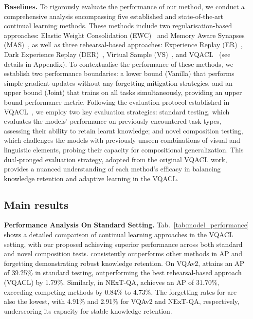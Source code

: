 \noindent\textbf{Baselines. }To rigorously evaluate the performance of our method, we conduct a comprehensive analysis encompassing five established and state-of-the-art continual learning methods. These methods include two regularisation-based approaches: Elastic Weight Consolidation (EWC)~\citep{kirkpatrick2017overcoming} and Memory Aware Synapses (MAS)~\citep{mas2018}, as well as three rehearsal-based approaches: Experience Replay (ER)~\citep{chaudhry2019tinyepisodicmemoriescontinual}, Dark Experience Replay (DER)~\citep{Chaudhry2019er}, Virtual Sample (VS)~\citep{Wan_2022_CVPR}, and VQACL~\citep{zhang2023vqacl} (see details in Appendix). To contextualise the performance of these methods, we establish two performance boundaries: a lower bound (Vanilla) that performs simple gradient updates without any forgetting mitigation strategies, and an upper bound (Joint) that trains on all tasks simultaneously, providing an upper bound performance metric. Following the evaluation protocol established in VQACL~\citep{zhang2023vqacl}, we employ two key evaluation strategies: standard testing, which evaluates the models' performance on previously encountered task types, assessing their ability to retain learnt knowledge; and novel composition testing, which challenges the models with previously unseen combinations of visual and linguistic elements, probing their capacity for compositional  generalization. This dual-pronged evaluation strategy, adopted from the original VQACL work, provides a nuanced understanding of each method's efficacy in balancing knowledge retention and adaptive learning in the VQACL.



\subsection{Main results}
\label{sec:mainresults}
\noindent\textbf{Performance Analysis On Standard Setting. }Tab.~\ref{tab:model_performance} shows a detailed comparison of continual learning approaches in the VQACL setting, with our proposed \qstmethodshort{} achieving superior performance across both standard and novel composition tests. \qstmethodshort{} consistently outperforms other methods in AP and forgetting demonstrating robust knowledge retention. On VQAv2, \qstmethodshort{} attains an AP of 39.25\% in standard testing, outperforming the best rehearsal-based approach (VQACL) by 1.79\%. Similarly, in NExT-QA, \qstmethodshort{} achieves an AP of 31.70\%, exceeding competing methods by 0.84\% to 4.73\%. The forgetting rates for \qstmethodshort{} are also the lowest, with 4.91\% and 2.91\% for VQAv2 and NExT-QA, respectively, underscoring its capacity for stable knowledge retention.

